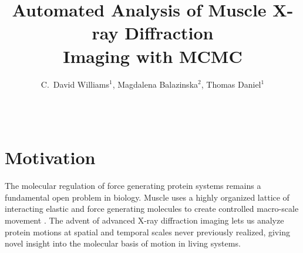\documentclass{sig-alternate}
\newcommand{\note}[2]{
    \textbf{\textcolor{#1}{#2}}
}
\newcommand{\dave}[1]{\note{PineGreen}{Dave: #1}}
\begin{document}
\title{Automated Analysis of Muscle X-ray Diffraction \\ Imaging with MCMC}
\author{C.\ David Williams$^{1}$,  Magdalena Balazinska$^2$, Thomas Daniel$^1$ \\
\\
 \\
}
\maketitle





\sloppy






\section{Motivation}
\label{sec:motivation}


The molecular regulation of force generating protein systems remains a
fundamental open problem in biology. Muscle uses a highly organized
lattice of interacting elastic and force generating molecules to
create controlled macro-scale movement \cite{Millman1998}. The advent
of advanced X-ray diffraction imaging lets us analyze protein motions
at spatial and temporal scales never previously realized, giving novel
insight into the molecular basis of motion in living systems.  
\end{document}
